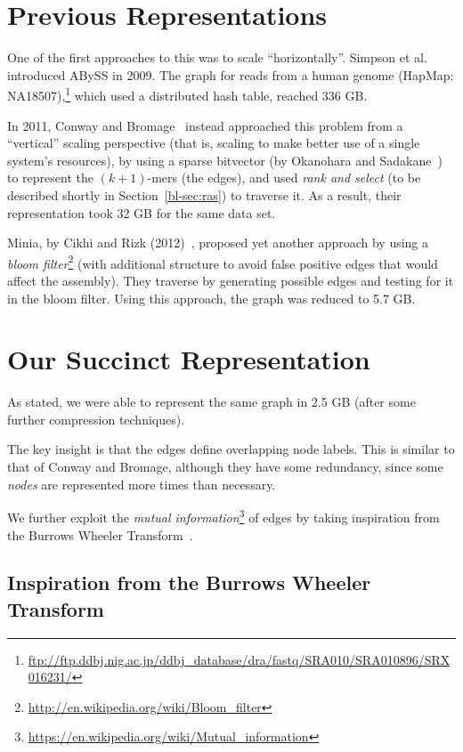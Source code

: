 \section{Previous Representations}\label{bl-sec:pre}

One of the first approaches to this was to scale ``horizontally''. Simpson et al.~\cite{Simpson:2009} introduced ABySS in 2009. The graph for reads from a human genome (HapMap: NA18507),\footnote{\url{ftp://ftp.ddbj.nig.ac.jp/ddbj_database/dra/fastq/SRA010/SRA010896/SRX016231/}} which used a distributed hash table, reached 336 GB.

In 2011, Conway and Bromage~\cite{conway} instead approached this problem from a ``vertical'' scaling perspective (that is, scaling to make better use of a single system's resources), by using a sparse bitvector (by Okanohara and Sadakane~\cite{bitvector}) to represent the $(k+1)$-mers (the edges), and used \emph{rank and select} (to be described shortly in Section~\ref{bl-sec:ras}) to traverse it. As a result, their representation took 32 GB for the same data set.

Minia, by Cikhi and Rizk (2012)~\cite{wabi}, proposed yet another approach by using a \emph{bloom filter}\footnote{\url{http://en.wikipedia.org/wiki/Bloom_filter}} (with additional structure to avoid false positive edges that would affect the assembly). They traverse by generating possible edges and testing for it in the bloom filter. Using this approach, the graph was reduced to 5.7 GB.

\section{Our Succinct Representation}\label{bl-sec:our}

As stated, we were able to represent the same graph in 2.5 GB (after some further compression techniques).

The key insight is that the edges define overlapping node labels. This is similar to that of Conway and Bromage, although they have some redundancy, since some \emph{nodes} are represented more times than necessary.

We further exploit the \emph{mutual information}\footnote{\url{https://en.wikipedia.org/wiki/Mutual_information}} of edges by taking inspiration from the Burrows Wheeler Transform~\cite{BW94}.

\subsection{Inspiration from the Burrows Wheeler Transform}\label{bl-sec:bur}

